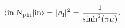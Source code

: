 \begin{equation}
\langle \rm{in}| N_{pln} | \mathrm{\rm{in}} \rangle = |\beta_l|^2 = \frac{1}{\sinh ^2 (\pi \mu) } .
\end{equation}

